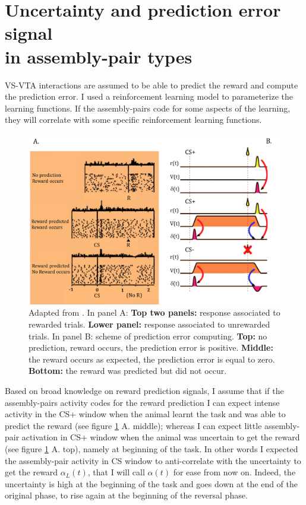 \section{Uncertainty and prediction error signal\\in assembly-pair types}
\label{sec:CorrRL}
VS-VTA interactions are assumed to be able to predict the reward and compute the prediction error. I used a reinforcement learning model to parameterize the learning functions. If the assembly-pairs code for some aspects of the learning, they will correlate with some specific reinforcement learning functions.
\begin{figure}
    \centering
    \includegraphics[scale=0.35]{figures/RewardDoyaRLSUM.png}
    \caption{Adapted from \cite{Doya}. In panel A: \textbf{Top two panels:} response associated to rewarded trials. \textbf{Lower panel:} response associated to unrewarded trials. In panel B: scheme of prediction error computing. \textbf{Top:} no prediction, reward occurs, the prediction error is positive. \textbf{Middle:} the reward occurs as expected, the prediction error is equal to zero. \textbf{Bottom:} the reward was predicted but did not occur.}
    \label{fig:RewDoyaSum}
\end{figure}
Based on broad knowledge on reward prediction signals, I assume that if the assembly-pairs activity codes for the reward prediction I can expect intense activity in the CS+ window when the animal learnt the task and was able to predict the reward (see figure \ref{fig:RewDoyaSum} A. middle); whereas I can expect little assembly-pair activation in CS+ window when the animal was uncertain to get the reward (see figure \ref{fig:RewDoyaSum} A. top), namely at beginning of the task. In other words I expected the assembly-pair activity in CS window to anti-correlate with the uncertainty to get the reward $\alpha_L(t)$, that I will call $\alpha(t)$ for ease from now on. Indeed, the uncertainty is high at the beginning of the task and goes down at the end of the original phase, to rise again at the beginning of the reversal phase. 
